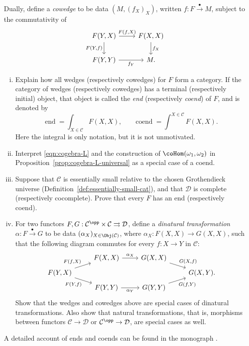 \begin{Exercises}
	Dually, define a \emph{cowedge} to be data $(M,(f_X)_X)$, written $f:F\xrightarrow{\bullet}M$, subject to the commutativity of
	\[\begin{tikzcd}
		F(Y, X) \arrow[r, "{F(f, X)}"] \arrow[d, "{F(Y, f)}"'] & F(X, X) \arrow[d, "{f_X}"] \\
		F(Y, Y) \arrow[r, "{f_Y}"'] & M.
	\end{tikzcd}\]
	\begin{enumerate}[(i)]
		\item Explain how all wedges (respectively cowedges) for $F$ form a category. If the category of wedges (respectively cowedges) has a terminal (respectively initial) object, that object is called the \emph{end} (respectively \emph{coend}) of $F$, and is denoted by
		\[ \text{end}\;=\int_{X\in\mathcal{C}}F(X,X),\qquad
		\text{coend}\;=\int^{X\in\mathcal{C}}F(X,X). \]
		Here the integral is only notation, but it is not unmotivated.
		\item Interpret \eqref{eqn:cogebra-L} and the construction of $\coHom(\omega_1,\omega_2)$ in Proposition~\ref{prop:cogebra-L-universal} as a special case of a coend.
		\item Suppose that $\mathcal{C}$ is essentially small relative to the chosen Grothendieck universe (Definition~\ref{def:essentially-small-cat}), and that $\mathcal{D}$ is complete (respectively cocomplete). Prove that every $F$ has an end (respectively coend).
		\item For two functors
		$F,G:\mathcal{C}^{\opp}\times\mathcal{C}\rightrightarrows\mathcal{D}$,
		define a \emph{dinatural transformation}
		$\alpha:F\xrightarrow{\bullet}G$ to be data
		$(\alpha_X)_{X\in\Obj(\mathcal{C})}$, where
		$\alpha_X:F(X,X)\to G(X,X)$, such that the following diagram commutes for every $f:X\to Y$ in $\mathcal{C}$:
		\[\begin{tikzcd}[row sep=tiny]
			& F(X, X) \arrow[r, "{\alpha_X}"] & G(X, X) \arrow[rd, "{G(X, f)}"] & \\
			F(Y, X) \arrow[ru, "{F(f, X)}"] \arrow[rd, "{F(Y, f)}"'] & & & G(X, Y). \\
			& F(Y, Y) \arrow[r, "{\alpha_Y}"'] & G(Y, Y) \arrow[ru, "{G(f, Y)}"'] &
		\end{tikzcd}\]
		Show that the wedges and cowedges above are special cases of dinatural transformations. Also show that natural transformations, that is, morphisms between functors $\mathcal{C}\to\mathcal{D}$ or $\mathcal{C}^{\opp}\to\mathcal{D}$, are special cases as well.
	\end{enumerate}
	A detailed account of ends and coends can be found in the monograph \cite{Lor21}.


\end{Exercises}

